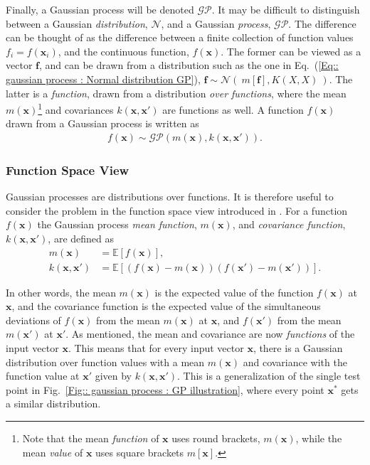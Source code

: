\documentclass[twoside,english]{uiofysmaster}
\begin{document}
{{Finally, a Gaussian process will be denoted $\mathcal{GP}$. It may be difficult to distinguish between a Gaussian \textit{distribution}, $\mathcal{N}$, and a Gaussian \textit{process}, $\mathcal{GP}$. The difference can be thought of as the difference between a finite collection of function values $f_i = f(\textbf{x}_i)$, and the continuous function, $f(\textbf{x})$. The former can be viewed as a vector $\textbf{f}$, and can be drawn from a distribution such as the one in Eq.~(\ref{Eq:: gaussian process : Normal distribution GP}), $\textbf{f} \sim \mathcal{N}(~m[\textbf{f} ], K(X, X)~)$. The latter is a \textit{function}, drawn from a distribution \textit{over functions}, where the mean $m(\textbf{x})$\footnote{Note that the mean \textit{function} of $\textbf{x}$ uses round brackets, $m(\textbf{x})$, while the mean \textit{value} of $\textbf{x}$ uses square brackets $m[\textbf{x}]$.} and covariances $k(\textbf{x}, \textbf{x}')$ are functions as well. A function $f(\textbf{x})$ drawn from a Gaussian process is written as 
\begin{align}\label{Eq:: gaussian process : draw function from GP}
f(\textbf{x}) \sim \mathcal{GP} (m(\textbf{x}), k(\textbf{x}, \textbf{x}')).
\end{align}

\subsubsection{Function Space View}

Gaussian processes are distributions over functions. It is therefore useful to consider the problem in the function space view introduced in \cite{rasmussen2006gaussian}. For a function $f(\textbf{x})$ the Gaussian process \textit{mean function}, $m(\textbf{x})$, and \textit{covariance function}, $k(\textbf{x}, \textbf{x}')$, are defined as
\begin{align}
m(\textbf{x}) &= \mathbb{E}[f(\textbf{x})],\\
k(\textbf{x}, \textbf{x}') &= \mathbb{E} [(f(\textbf{x}) - m(\textbf{x}))(f(\textbf{x}') - m(\textbf{x}'))].
\end{align}

In other words, the mean $m(\textbf{x})$ is the expected value of the function $f(\textbf{x})$ at $\textbf{x}$, and the covariance function is the expected value of the simultaneous deviations of $f(\textbf{x})$ from the mean $m(\textbf{x})$ at $\textbf{x}$, and $f(\textbf{x}')$ from the mean $m(\textbf{x}')$ at $\textbf{x}'$. As mentioned, the mean and covariance are now \textit{functions} of the input vector $\textbf{x}$. This means that for every input vector $\textbf{x}$, there is a Gaussian distribution over function values with a mean $m(\textbf{x})$ and covariance with the function value at $\textbf{x}'$ given by $k(\textbf{x}, \textbf{x}')$. This is a generalization of the single test point in Fig.~\ref{Fig:: gaussian process : GP illustration}, where every point $\textbf{x}^*$ gets a similar distribution.

}}
\end{document}
